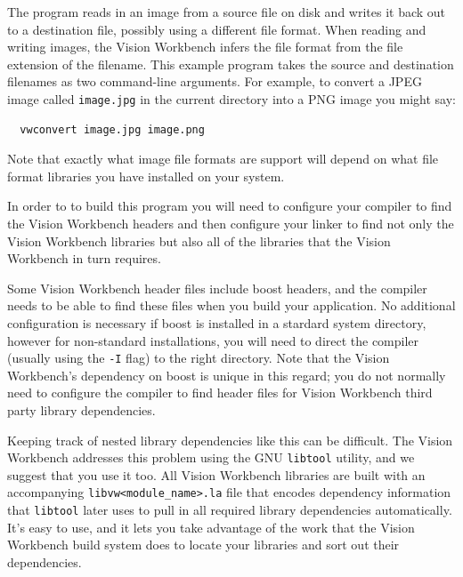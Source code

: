 
The program reads in an image from a source file on disk and writes it
back out to a destination file, possibly using a different file
format.  When reading and writing images, the Vision Workbench infers
the file format from the file extension of the filename.  This example
program takes the source and destination filenames as two command-line
arguments.  For example, to convert a JPEG image called
\verb#image.jpg# in the current directory into a PNG image you might
say:
\begin{verbatim}
  vwconvert image.jpg image.png
\end{verbatim}
Note that exactly what image file formats are support will depend on
what file format libraries you have installed on your system.

In order to to build this program you will need to configure your
compiler to find the Vision Workbench headers and then configure your
linker to find not only the Vision Workbench libraries but also all of
the libraries that the Vision Workbench in turn requires.  

Some Vision Workbench header files include boost headers, and the
compiler needs to be able to find these files when you build your
application.  No additional configuration is necessary if boost is
installed in a stardard system directory, however for non-standard
installations, you will need to direct the compiler (usually using the
\verb#-I# flag) to the right directory.  Note that the Vision
Workbench's dependency on boost is unique in this regard; you do not
normally need to configure the compiler to find header files for
Vision Workbench third party library dependencies.

Keeping track of nested library dependencies like this can be
difficult.  The Vision Workbench addresses this problem using the GNU
\verb#libtool# utility, and we suggest that you use it too.  All
Vision Workbench libraries are built with an accompanying
\verb#libvw<module_name>.la# file that encodes dependency information that
\verb#libtool# later uses to pull in all required library dependencies
automatically.  It's easy to use, and it lets you take advantage of
the work that the Vision Workbench build system does to locate your
libraries and sort out their dependencies.



